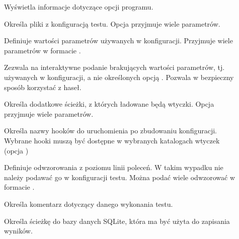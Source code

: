 \documentclass[00-praca-magisterska.tex]{subfiles}
\begin{document}
\begin{description}
\item[]

Wyświetla informacje dotyczące opcji programu.

\item[]

Określa pliki z konfiguracją testu. Opcja przyjmuje wiele parametrów.

\item[]

Definiuje wartości parametrów używanych w konfiguracji. Przyjmuje wiele
parametrów w formacie .

\item[]

Zezwala na interaktywne podanie brakujących wartości parametrów, tj. używanych w
konfiguracji, a nie określonych opcją . Pozwala w bezpieczny sposób
korzystać z haseł.

\item[]

Określa dodatkowe ścieżki, z których ładowane będą wtyczki. Opcja przyjmuje
wiele parametrów.

\item[]

Określa nazwy hooków do uruchomienia po zbudowaniu konfiguracji. Wybrane hooki
muszą być dostępne w wybranych katalogach wtyczek (opcja )

\item[]

Definiuje odwzorowania z poziomu linii poleceń. W takim wypadku nie należy
podawać go w konfiguracji testu. Można podać wiele odwzorować w formacie
.

\item[]

Określa komentarz dotyczący danego wykonania testu.

\item[]

Określa ścieżkę do bazy danych SQLite, która ma być użyta do zapisania wyników.

\end{description}
\end{document}
